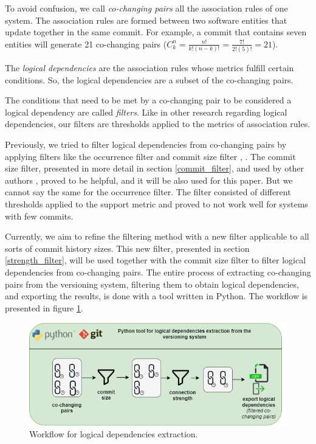 \documentclass[runningheads]{comsis2}
\newcommand*{\Comb}[2]{{}C^{#1}_{#2}}%
\begin{document}
To avoid confusion, we call \textit{co-changing pairs} all the association rules of one system. The association rules are formed between two software entities that update together in the same commit.
For example, a commit that contains seven entities will generate 21 co-changing pairs ($\Comb{n}{k}=\frac{n!}{k!(n-k)!} = \frac{7!}{2!(5)!} = 21$).


The \textit{logical dependencies} are the association rules whose metrics fulfill certain conditions. So, the logical dependencies are a subset of the co-changing pairs. 

The conditions that need to be met by a co-changing pair to be considered a logical dependency are called \textit{filters}. Like in other research regarding logical dependencies, our filters are thresholds applied to the metrics of association rules. 

Previously, we tried to filter logical dependencies from co-changing pairs by applying filters like the occurrence filter and commit size filter \cite{saci19}, \cite{enase19}. 
The commit size filter, presented in more detail in section \ref{commit_filter}, and used by other authors \cite{DBLP:journals/jss/AjienkaC17}, proved to be helpful, and it will be also used for this paper. 
But we cannot say the same for the occurrence filter. The filter consisted of different thresholds applied to the support metric and proved to not work well for systems with few commits.

Currently, we aim to refine the filtering method with a new filter applicable to all sorts of commit history sizes. This new filter, presented in section \ref{strength_filter}, will be used together with the commit size filter to filter logical dependencies from co-changing pairs. The entire process of extracting co-changing pairs from the versioning system, filtering them to obtain logical dependencies, and exporting the results, is done with a tool written in Python. The workflow is presented in figure \ref{fig:workflow_key}.

\begin{figure}
\centering
\includegraphics[scale=0.6]{ld_workflow.png}
\caption{Workflow for logical dependencies extraction.}
\label{fig:workflow_key}
\centering
\end{figure}
\end{document}
